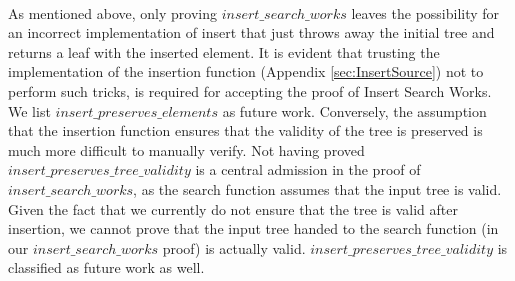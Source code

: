 \paragraph{}
As mentioned above, only proving $insert\_search\_works$ leaves the possibility for an incorrect implementation of insert that just throws away the initial tree and returns a leaf with the inserted element. It is evident that trusting the implementation of the insertion function (Appendix \ref{sec:InsertSource}) not to perform such tricks, is required for accepting the proof of Insert Search Works. We list $insert\_preserves\_elements$ as future work. Conversely, the assumption that the insertion function ensures that the validity of the tree is preserved is much more difficult to manually verify. Not having proved $insert\_preserves\_tree\_validity$ is a central admission in the proof of $insert\_search\_works$, as the search function assumes that the input tree is valid. Given the fact that we currently do not ensure that the tree is valid after insertion, we cannot prove that the input tree handed to the search function (in our $insert\_search\_works$ proof) is actually valid. $insert\_preserves\_tree\_validity$ is classified as future work as well.
